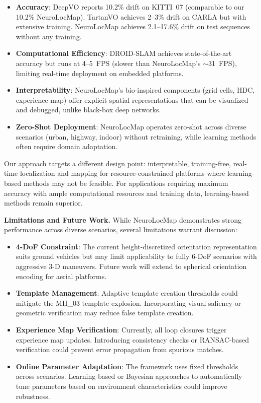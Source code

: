 \begin{itemize}
    \item \textbf{Accuracy}: DeepVO reports 10.2\% drift on KITTI~07 (comparable to our 10.2\% NeuroLocMap). TartanVO achieves 2--3\% drift on CARLA but with extensive training. NeuroLocMap achieves 2.1--17.6\% drift on test sequences without any training.
    
    \item \textbf{Computational Efficiency}: DROID-SLAM achieves state-of-the-art accuracy but runs at 4--5~FPS (slower than NeuroLocMap's $\sim$31~FPS), limiting real-time deployment on embedded platforms.
    
    \item \textbf{Interpretability}: NeuroLocMap's bio-inspired components (grid cells, HDC, experience map) offer explicit spatial representations that can be visualized and debugged, unlike black-box deep networks.
    
    \item \textbf{Zero-Shot Deployment}: NeuroLocMap operates zero-shot across diverse scenarios (urban, highway, indoor) without retraining, while learning methods often require domain adaptation.
\end{itemize}

Our approach targets a different design point: interpretable, training-free, real-time localization and mapping for resource-constrained platforms where learning-based methods may not be feasible. For applications requiring maximum accuracy with ample computational resources and training data, learning-based methods remain superior.

\textbf{Limitations and Future Work.} While NeuroLocMap demonstrates strong per\-for\-mance across diverse scenarios, several limitations warrant discussion:

\begin{itemize}
    \item \textbf{4-DoF Constraint}: The current height-discretized orientation representation suits ground vehicles but may limit applicability to fully 6-DoF scenarios with aggressive 3-D maneuvers. Future work will extend to spherical orientation encoding for aerial platforms.
    
    \item \textbf{Template Man\-age\-ment}: Adaptive template creation thresholds could mitigate the MH\_03 template explosion. Incorporating visual saliency or geometric verification may reduce false template creation.
    
    \item \textbf{Experience Map Verification}: Currently, all loop closures trigger experience map updates. Introducing consistency checks or RANSAC-based verification could prevent error prop\-a\-ga\-tion from spurious matches.
    
    \item \textbf{Online Parameter Adaptation}: The framework uses fixed thresholds across scenarios. Learning-based or Bayesian approaches to automatically tune parameters based on environment characteristics could improve robustness.
\end{itemize}

